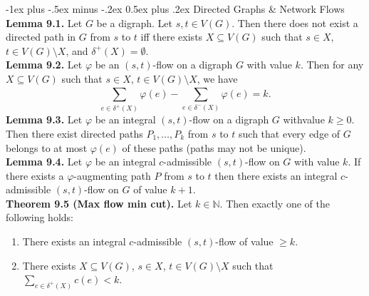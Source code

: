 \documentclass[10pt,landscape]{article}
\makeatletter
\renewcommand{\section}{\@startsection{section}{1}{0mm}%
                                {-1ex plus -.5ex minus -.2ex}%
                                {0.5ex plus .2ex}%
                                {\normalfont\large\bfseries}}
\makeatother
\begin{document}
\begin{multicols}{3}
\section{Directed Graphs \& Network Flows}
\textbf{Lemma 9.1.} Let \( G \) be a digraph. Let \( s, t \in V(G) \). Then there does not exist a directed path in \( G \) from \( s \) to \( t \) iff there exists \( X \subseteq V(G) \) such that \( s \in X \), \( t \in V(G) \setminus X \), and \( \delta ^{+}(X) = \emptyset   \). \\
\textbf{Lemma 9.2.} Let \( \varphi  \) be an \( (s,t) \)-flow on a digraph \( G \) with value \( k \). Then for any \( X \subseteq V(G) \) such that \( s \in X \), \( t \in V(G) \setminus X \), we have \[\sum_{e \in \delta ^{+}(X) }^{}\varphi (e) - \sum_{e \in \delta ^{-}(X)}^{}\varphi (e) = k.\]
\textbf{Lemma 9.3.} Let \( \varphi  \) be an integral \( (s,t) \)-flow on a digraph \( G \) withvalue \( k \geq 0 \). Then there exist directed paths \( P_1, \hdots , P_{k}  \) from \( s \) to \( t \) such that every edge of \( G \) belongs to at most \( \varphi (e) \) of these paths (paths may not be unique). \\
\textbf{Lemma 9.4.} Let \( \varphi \) be an integral \( c \)-admissible \( (s,t) \)-flow on \( G \) with value \( k \). If there exists a \( \varphi \)-augmenting path \( P \) from \( s \) to \( t \) then there exists an integral \( c \)-admissible \( (s,t) \)-flow on \( G \) of value \( k + 1 \). \\
\textbf{Theorem 9.5 (Max flow min cut).} Let \( k \in \mathbb{N}  \). Then exactly one of the following holds:
\begin{enumerate}
	\item There exists an integral \( c \)-admissible \( (s,t) \)-flow of value \( \geq k \).
	\item There exists \( X \subseteq V(G) \), \( s \in X \), \( t \in V(G) \setminus X \) such that \( \sum_{e \in \delta ^{+} (X)}^{} c(e) < k \).
\end{enumerate}

\end{multicols}
\end{document}
